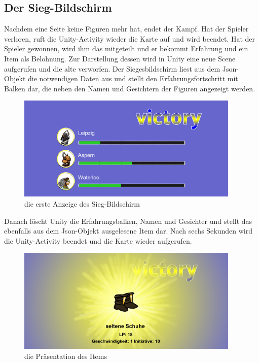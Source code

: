 \documentclass[extern,palatino]{cgBA}
\begin{document}
\subsection{Der Sieg-Bildschirm}
Nachdem eine Seite keine Figuren mehr hat, endet der Kampf. Hat der Spieler verloren, ruft die Unity-Activity wieder die Karte auf und wird beendet. Hat der Spieler gewonnen, wird ihm das mitgeteilt und er bekommt Erfahrung und ein Item als Belohnung. Zur Darstellung dessen wird in Unity eine neue Scene aufgerufen und die alte verworfen. Der Siegesbildschirm liest aus dem Json-Objekt die notwendigen Daten aus und stellt den Erfahrungsfortschritt mit Balken dar, die neben den Namen und Gesichtern der Figuren angezeigt werden. 
\begin{figure}[H]
		\centering
		\includegraphics[height=5cm]{sieg1}
		\caption{die erste Anzeige des Sieg-Bildschirm}
\end{figure}
Danach löscht Unity die Erfahrungsbalken, Namen und Gesichter und stellt das ebenfalls aus dem Json-Objekt ausgelesene Item dar. Nach sechs Sekunden wird die Unity-Activity beendet und die Karte wieder aufgerufen.
\begin{figure}[H]
		\centering
		\includegraphics[height=5cm]{sieg2}
		\caption{die Präsentation des Items}
\end{figure}
\newpage
\end{document}
